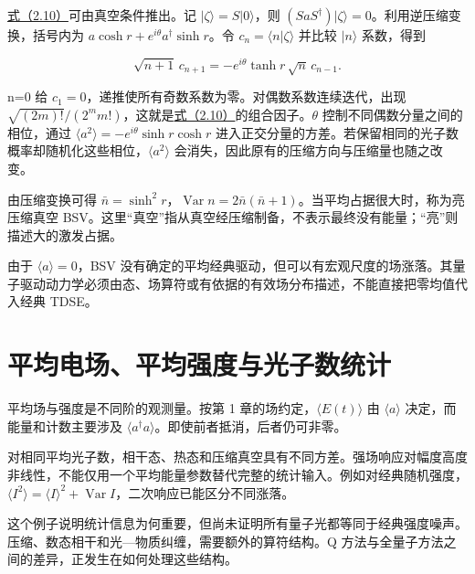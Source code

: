 \documentclass[UTF8,a4paper,zihao=-4,openany,fontset=fandol]{ctexbook}
\begin{document}
\hyperref[eq:2.10]{式（2.10）}可由真空条件推出。记 $|\zeta\rangle=S|0\rangle$，则 $(SaS^\dagger)|\zeta\rangle=0$。利用逆压缩变换，括号内为 $a\cosh r+e^{i\theta}a^\dagger\sinh r$。令 $c_n=\langle n|\zeta\rangle$ 并比较 $|n\rangle$ 系数，得到



\begin{equation*}
\sqrt{n+1}\,c_{n+1}
=-e^{i\theta}\tanh r\,\sqrt n\,c_{n-1}.
\tag{2.10a}\label{eq:2.10a}
\end{equation*}


n=0 给 $c_1=0$，递推使所有奇数系数为零。对偶数系数连续迭代，出现 $\sqrt{(2m)!}/(2^m m!)$，这就是\hyperref[eq:2.10]{式（2.10）}的组合因子。$\theta$ 控制不同偶数分量之间的相位，通过 $\langle a^2\rangle=-e^{i\theta}\sinh r\cosh r$ 进入正交分量的方差。若保留相同的光子数概率却随机化这些相位，$\langle a^2\rangle$ 会消失，因此原有的压缩方向与压缩量也随之改变。



由压缩变换可得 $\bar n=\sinh^2r$，$\operatorname{Var}n=2\bar n(\bar n+1)$。当平均占据很大时，称为亮压缩真空 BSV。这里“真空”指从真空经压缩制备，不表示最终没有能量；“亮”则描述大的激发占据。



由于 $\langle a\rangle=0$，BSV 没有确定的平均经典驱动，但可以有宏观尺度的场涨落。其量子驱动动力学必须由态、场算符或有依据的有效场分布描述，不能直接把零均值代入经典 TDSE。



\section{平均电场、平均强度与光子数统计}\label{sec:02:8}


平均场与强度是不同阶的观测量。按第 1 章的场约定，$\langle E(t)\rangle$ 由 $\langle a\rangle$ 决定，而能量和计数主要涉及 $\langle a^\dagger a\rangle$。即使前者抵消，后者仍可非零。



对相同平均光子数，相干态、热态和压缩真空具有不同方差。强场响应对幅度高度非线性，不能仅用一个平均能量参数替代完整的统计输入。例如对经典随机强度，$\langle I^2\rangle=\langle I\rangle^2+\operatorname{Var}I$，二次响应已能区分不同涨落。



这个例子说明统计信息为何重要，但尚未证明所有量子光都等同于经典强度噪声。压缩、数态相干和光—物质纠缠，需要额外的算符结构。Q 方法与全量子方法之间的差异，正发生在如何处理这些结构。
\end{document}
